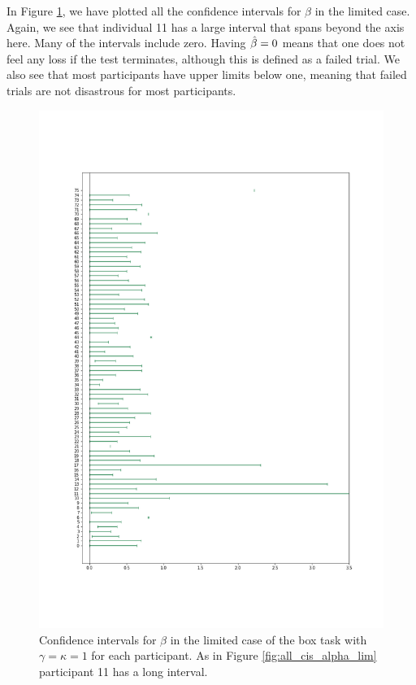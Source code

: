 In Figure \ref{fig:all_cis_beta}, we have plotted all the confidence intervals for $\beta$ in the limited case. Again, we see that individual 11 has a large interval that spans beyond the axis here. Many of the intervals include zero. Having $\hat{\beta}=0$ means that one does not feel any loss if the test terminates, although this is defined as a failed trial. We also see that most participants have upper limits below one, meaning that failed trials are not disastrous for most participants. 
\begin{figure}
    \centering
    \includegraphics[scale=0.38]{pictures/all_cis_lim_beta.png}
    \caption[CIs for $\beta$, limited. $\gamma=\kappa=1$]{Confidence intervals for $\beta$ in the limited case of the box task with $\gamma=\kappa=1$ for each participant. As in Figure \ref{fig:all_cis_alpha_lim} participant 11 has a long interval.}
    \label{fig:all_cis_beta}
\end{figure}

